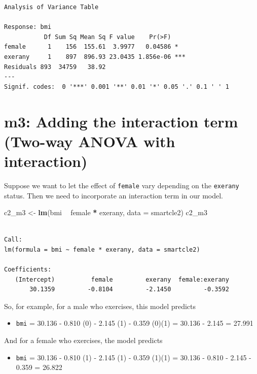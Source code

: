 \documentclass[]{book}
\newenvironment{Shaded}{\begin{snugshade}}{\end{snugshade}}
\newcommand{\KeywordTok}[1]{\textcolor[rgb]{0.13,0.29,0.53}{\textbf{#1}}}
\newcommand{\DataTypeTok}[1]{\textcolor[rgb]{0.13,0.29,0.53}{#1}}
\newcommand{\StringTok}[1]{\textcolor[rgb]{0.31,0.60,0.02}{#1}}
\newcommand{\OperatorTok}[1]{\textcolor[rgb]{0.81,0.36,0.00}{\textbf{#1}}}
\newcommand{\NormalTok}[1]{#1}
\providecommand{\tightlist}{%
  \setlength{\itemsep}{0pt}\setlength{\parskip}{0pt}}
\theoremstyle{definition}
\theoremstyle{definition}
\theoremstyle{definition}
\theoremstyle{remark}
\begin{document}
\begin{verbatim}
Analysis of Variance Table

Response: bmi
           Df Sum Sq Mean Sq F value    Pr(>F)    
female      1    156  155.61  3.9977   0.04586 *  
exerany     1    897  896.93 23.0435 1.856e-06 ***
Residuals 893  34759   38.92                      
---
Signif. codes:  0 '***' 0.001 '**' 0.01 '*' 0.05 '.' 0.1 ' ' 1
\end{verbatim}

\section{m3: Adding the interaction term (Two-way ANOVA with
interaction)}\label{m3-adding-the-interaction-term-two-way-anova-with-interaction}

Suppose we want to let the effect of \texttt{female} vary depending on
the \texttt{exerany} status. Then we need to incorporate an interaction
term in our model.

\begin{Shaded}
\begin{Highlighting}[]
\NormalTok{c2_m3 <-}\StringTok{ }\KeywordTok{lm}\NormalTok{(bmi }\OperatorTok{~}\StringTok{ }\NormalTok{female }\OperatorTok{*}\StringTok{ }\NormalTok{exerany, }\DataTypeTok{data =}\NormalTok{ smartcle2)}
\NormalTok{c2_m3}
\end{Highlighting}
\end{Shaded}

\begin{verbatim}

Call:
lm(formula = bmi ~ female * exerany, data = smartcle2)

Coefficients:
   (Intercept)          female         exerany  female:exerany  
       30.1359         -0.8104         -2.1450         -0.3592  
\end{verbatim}

So, for example, for a male who exercises, this model predicts

\begin{itemize}
\tightlist
\item
  \texttt{bmi} = 30.136 - 0.810 (0) - 2.145 (1) - 0.359 (0)(1) = 30.136
  - 2.145 = 27.991
\end{itemize}

And for a female who exercises, the model predicts

\begin{itemize}
\tightlist
\item
  \texttt{bmi} = 30.136 - 0.810 (1) - 2.145 (1) - 0.359 (1)(1) = 30.136
  - 0.810 - 2.145 - 0.359 = 26.822
\end{itemize}
\end{document}
